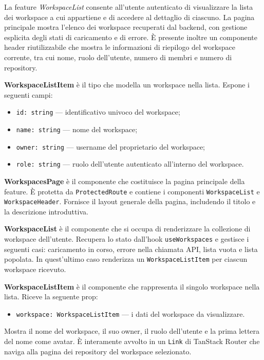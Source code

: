 \documentclass[a4paper, 11pt]{article}
\newcounter{subsubsubsection}[subsubsection]
\newcounter{subsubsubsubsection}[subsubsubsection]
\begin{document}
La feature \textit{WorkspaceList} consente all'utente autenticato di visualizzare la lista dei
workspace a cui appartiene e di accedere al dettaglio di ciascuno. La pagina principale mostra
l'elenco dei workspace recuperati dal backend, con gestione esplicita degli stati di caricamento
e di errore. È presente inoltre un componente header riutilizzabile che mostra le informazioni
di riepilogo del workspace corrente, tra cui nome, ruolo dell'utente, numero di membri e numero
di repository.


\textbf{WorkspaceListItem} è il tipo che modella un workspace nella lista. Espone i seguenti
campi:
\begin{itemize}
  \item \texttt{id: string} — identificativo univoco del workspace;
  \item \texttt{name: string} — nome del workspace;
  \item \texttt{owner: string} — username del proprietario del workspace;
  \item \texttt{role: string} — ruolo dell'utente autenticato all'interno del workspace.
\end{itemize}


\textbf{WorkspacesPage} è il componente che costituisce la pagina principale della feature.
È protetta da \texttt{ProtectedRoute} e contiene i componenti \texttt{WorkspaceList} e
\texttt{WorkspaceHeader}. Fornisce il layout generale della pagina, includendo il titolo e
la descrizione introduttiva.

\textbf{WorkspaceList} è il componente che si occupa di renderizzare la collezione di workspace
dell'utente. Recupera lo stato dall'hook \texttt{useWorkspaces} e gestisce i seguenti casi:
caricamento in corso, errore nella chiamata API, lista vuota e lista popolata. In quest'ultimo
caso renderizza un \texttt{WorkspaceListItem} per ciascun workspace ricevuto.

\textbf{WorkspaceListItem} è il componente che rappresenta il singolo workspace nella lista.
Riceve la seguente prop:
\begin{itemize}
  \item \texttt{workspace: WorkspaceListItem} — i dati del workspace da visualizzare.
\end{itemize}
Mostra il nome del workspace, il suo owner, il ruolo dell'utente e la prima lettera del nome
come avatar. È interamente avvolto in un \texttt{Link} di TanStack Router che naviga alla pagina
dei repository del workspace selezionato.
\end{document}
